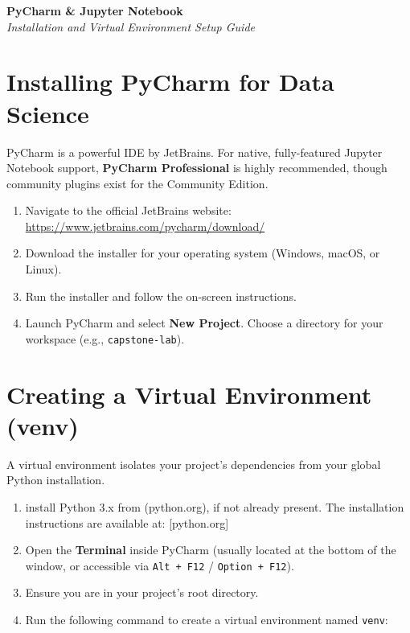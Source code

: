 \documentclass[12pt, a4paper]{article}
\begin{document}
\begin{center}
    {\Huge \textbf{\color{primarycolor} PyCharm \& Jupyter Notebook}}\\[0.5em]
    {\Large \textit{Installation and Virtual Environment Setup Guide}}\\[1.5em]
\end{center}

\section{Installing PyCharm for Data Science}

PyCharm is a powerful IDE by JetBrains. For native, fully-featured Jupyter Notebook support, \textbf{PyCharm Professional} is highly recommended, though community plugins exist for the Community Edition.

\begin{enumerate}
    \item Navigate to the official JetBrains website: \url{https://www.jetbrains.com/pycharm/download/}
    \item Download the installer for your operating system (Windows, macOS, or Linux).
    \item Run the installer and follow the on-screen instructions.
    \item Launch PyCharm and select \textbf{New Project}. Choose a directory for your workspace (e.g., \texttt{capstone-lab}).
\end{enumerate}

\section{Creating a Virtual Environment (venv)}

A virtual environment isolates your project's dependencies from your global Python installation.

\begin{enumerate}
    \item install Python 3.x from (python.org), if not already present. The installation instructions are available at: [python.org]
    \item Open the \textbf{Terminal} inside PyCharm (usually located at the bottom of the window, or accessible via \texttt{Alt + F12} / \texttt{Option + F12}).
    \item Ensure you are in your project's root directory.
    \item Run the following command to create a virtual environment named \texttt{venv}:
\end{enumerate}
\end{document}
